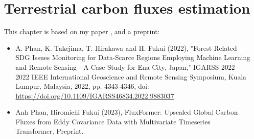 \chapter{Terrestrial carbon fluxes estimation} \label{chap4}

\renewcommand{\headrulewidth}{0pt}
\lhead[\thepage]{\rightmark}
\rhead[\rightmark]{\thepage}
\cfoot[]{}

This chapter is based on my paper \citep{phan2022forest}, and a preprint:
\begin{itemize}
    \item A. Phan, K. Takejima, T. Hirakawa and H. Fukui (2022),  "Forest-Related SDG Issues Monitoring for Data-Scarce Regions Employing Machine Learning and Remote Sensing - A Case Study for Ena City, Japan," IGARSS 2022 - 2022 IEEE International Geoscience and Remote Sensing Symposium, Kuala Lumpur, Malaysia, 2022, pp. 4343-4346, doi: \url{https://doi.org/10.1109/IGARSS46834.2022.9883037}.
    \item Anh Phan, Hiromichi Fukui (2023), FluxFormer: Upscaled Global Carbon Fluxes from Eddy Covariance Data with Multivariate Timeseries Transformer, Preprint.
\end{itemize}


